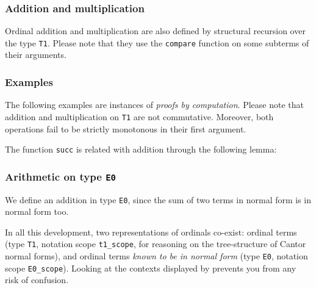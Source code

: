 \subsubsection{Addition and multiplication}

Ordinal addition and multiplication are also defined by structural recursion over the type \texttt{T1}. Please note that they use the \texttt{compare} function on some subterms of their arguments.

\label{sect:infix-plus-T1}





\subsubsection{Examples}

The following examples are instances of \emph{proofs by computation}. Please note that  addition and multiplication on \texttt{T1}
are not commutative. Moreover,  both operations fail to be strictly monotonous in their first argument.






The function \texttt{succ} is related with addition through the following lemma:





\subsubsection{Arithmetic on type \texttt{E0}}

 We define an addition in type \texttt{E0}, since the sum of two terms in normal form is in normal form too.







\begin{remark}
In all this development, two representations of ordinals co-exist: ordinal terms (type \texttt{T1}, notation scope \texttt{t1\_scope}, for reasoning on the tree-structure of Cantor normal forms), and ordinal terms \emph{known to be in normal form} (type \texttt{E0}, notation scope \texttt{E0\_scope}). Looking at the contexts displayed by \coq{} prevents you from any risk of confusion.
\end{remark}

